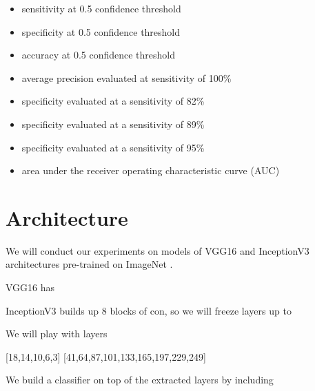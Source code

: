 \begin{itemize}
    \item sensitivity at 0.5 confidence threshold
    \item specificity at 0.5 confidence threshold
    \item accuracy at 0.5 confidence threshold
    \item average precision evaluated at sensitivity of 100\%
    \item specificity evaluated at a sensitivity of 82\%
    \item specificity evaluated at a sensitivity of 89\%
    \item specificity evaluated at a sensitivity of 95\%
    \item area under the receiver operating characteristic curve (AUC)
\end{itemize}

\section{Architecture}

We will conduct our experiments on models of VGG16 \cite{vgg16} and InceptionV3 \cite{inceptionv3} architectures pre-trained on ImageNet \cite{imagenet}.

VGG16 has

InceptionV3 builds up 8 blocks of con, so we will freeze layers up to

We will play with layers

        [18,14,10,6,3]
        [41,64,87,101,133,165,197,229,249]

We build a classifier on top of the extracted layers by including

